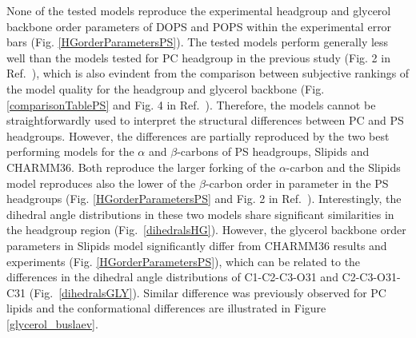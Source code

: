 \documentclass[aps,prl,superscriptaddress,twocolumn]{revtex4}
\begin{document}
None of the tested models reproduce the experimental headgroup and 
glycerol backbone order parameters of DOPS and POPS within the
experimental error bars (Fig. \ref{HGorderParametersPS}). 
The tested models perform generally less well than the models tested
for PC headgroup in the previous study (Fig. 2 in Ref.~\cite{botan15}),
which is also evindent from the comparison between subjective rankings
of the model quality for the headgroup and glycerol backbone 
(Fig. \ref{comparisonTablePS} and Fig. 4 in Ref.~\cite{botan15}).
Therefore, the models cannot be straightforwardly used to interpret the
structural differences between PC and PS headgroups. 
However, the differences are partially reproduced by the two best performing 
models for the $\alpha$ and $\beta$-carbons of PS headgroups, Slipids and CHARMM36.
Both reproduce the larger forking of the $\alpha$-carbon 
and the Slipids model reproduces also the lower of the $\beta$-carbon order 
in parameter in the PS headgroups (Fig. \ref{HGorderParametersPS} and Fig. 2 in Ref.~).
Interestingly, the dihedral angle distributions 
in these two models share significant similarities in the headgroup region (Fig.~\ref{dihedralsHG}). 
However, the glycerol backbone order parameters in Slipids model
significantly differ from CHARMM36 results and experiments (Fig. \ref{HGorderParametersPS}),
which can be related to the differences in the dihedral angle distributions 
of C1-C2-C3-O31 and C2-C3-O31-C31 (Fig.~\ref{dihedralsGLY}). 
Similar difference was previously observed for PC lipids \cite{botan15}
and the conformational differences are illustrated in Figure \ref{glycerol_buslaev}. 

\end{document}

